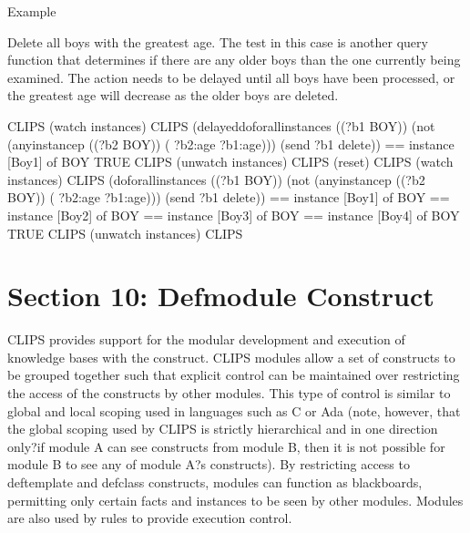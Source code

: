 \documentclass[letterpaper,10pt,english]{sphinxmanual}
\begin{document}

\begin{sphinxVerbatim}[commandchars=\\\{\}]
   
\end{sphinxVerbatim}

Example

Delete all boys with the greatest age. The test in this case is another
query function that determines if there are any older boys than the one
currently being examined. The action needs to be delayed until all boys
have been processed, or the greatest age will decrease as the older boys
are deleted.

\begin{sphinxVerbatim}[commandchars=\\\{\}]
CLIPS\PYGZgt{} (watch instances)
CLIPS\PYGZgt{}
(delayed\PYGZhy{}do\PYGZhy{}for\PYGZhy{}all\PYGZhy{}instances ((?b1 BOY))
  (not (any\PYGZhy{}instancep ((?b2 BOY))
  (\PYGZgt{} ?b2:age ?b1:age)))
  (send ?b1 delete))
\PYGZlt{}== instance [Boy\PYGZhy{}1] of BOY
TRUE
CLIPS\PYGZgt{} (unwatch instances)
CLIPS\PYGZgt{} (reset)
CLIPS\PYGZgt{} (watch instances)
CLIPS\PYGZgt{}
(do\PYGZhy{}for\PYGZhy{}all\PYGZhy{}instances ((?b1 BOY))
  (not (any\PYGZhy{}instancep ((?b2 BOY))
  (\PYGZgt{} ?b2:age ?b1:age)))
  (send ?b1 delete))
\PYGZlt{}== instance [Boy\PYGZhy{}1] of BOY
\PYGZlt{}== instance [Boy\PYGZhy{}2] of BOY
\PYGZlt{}== instance [Boy\PYGZhy{}3] of BOY
\PYGZlt{}== instance [Boy\PYGZhy{}4] of BOY
TRUE
CLIPS\PYGZgt{} (unwatch instances)
CLIPS\PYGZgt{}
\end{sphinxVerbatim}
\label{\detokenize{cool:section-7}}

\chapter{Section 10: Defmodule Construct}
\label{\detokenize{defmodule:section-10-defmodule-construct}}\label{\detokenize{defmodule::doc}}
CLIPS provides support for the modular development and execution of
knowledge bases with the  construct. CLIPS modules allow a
set of constructs to be grouped together such that explicit control can
be maintained over restricting the access of the constructs by other
modules. This type of control is similar to global and local scoping
used in languages such as C or Ada (note, however, that the global
scoping used by CLIPS is strictly hierarchical and in one direction
only?if module A can see constructs from module B, then it is not
possible for module B to see any of module A?s constructs). By
restricting access to deftemplate and defclass constructs, modules can
function as blackboards, permitting only certain facts and instances to
be seen by other modules. Modules are also used by rules to provide
execution control.
\end{document}
